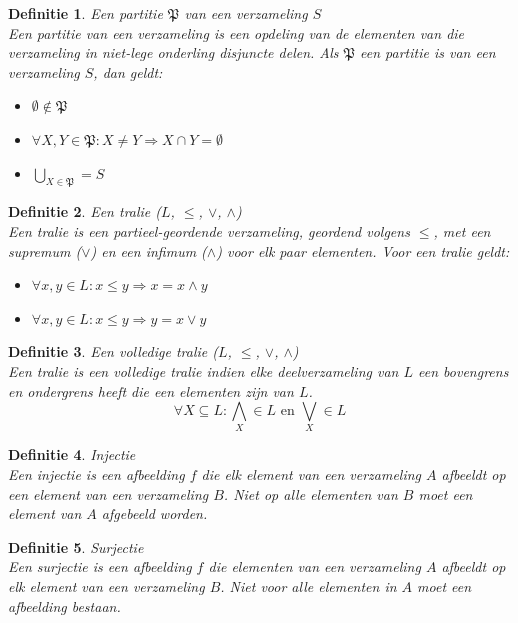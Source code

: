 \documentclass[a4paper]{article}
\newtheorem{tdefinitie}{Definitie}[section]
\newenvironment{definitie}[1]%
  {\begin{mdframed}[backgroundcolor=silver,
    topline=false,
    rightline=false,
    leftline=false,
    bottomline=false]\begin{tdefinitie}#1\\\normalfont}%
  {\end{tdefinitie}\end{mdframed}}
\newcommand{\partition}{\ensuremath{\mathfrak{P}}}
\newcommand{\en}{\ensuremath{\text{ en }}}
\begin{document}
\begin{definitie}{Een partitie $\partition$ van een verzameling $S$}
  Een partitie van een verzameling is een opdeling van de elementen van die verzameling in niet-lege onderling disjuncte delen. Als $\partition$ een partitie is van een verzameling $S$, dan geldt:
  \begin{itemize}
  \item $\emptyset \notin \partition$
  \item $\forall X, Y \in \partition: X \neq Y \Rightarrow X \cap Y = \emptyset$
  \item $\bigcup_{X \in \partition} = S$
  \end{itemize}
\end{definitie}

\begin{definitie}{Een tralie ($L$, $\leq$, $\vee$, $\wedge$)}
  Een tralie is een partieel-geordende verzameling, geordend volgens $\leq$, met een supremum ($\vee$) en een infimum ($\wedge$) voor elk paar elementen. Voor een tralie geldt:
  \begin{itemize}
  \item $\forall x, y \in L: x \leq y \Rightarrow x = x \wedge y$
  \item $\forall x, y \in L: x \leq y \Rightarrow y = x \vee y$
  \end{itemize}
\end{definitie}

\begin{definitie}{Een volledige tralie ($L$, $\leq$, $\vee$, $\wedge$)}
  Een tralie is een volledige tralie indien elke deelverzameling van $L$ een bovengrens en ondergrens heeft die een elementen zijn van $L$.
  \begin{equation*}
  \forall X \subseteq L: \bigwedge_X \in L \en \bigvee_X \in L
  \end{equation*}
\end{definitie}

\begin{definitie}{Injectie}
  \label{def:inj}
  Een injectie is een afbeelding $f$ die elk element van een verzameling $A$ afbeeldt op een element van een verzameling $B$. Niet op alle elementen van $B$ moet een element van $A$ afgebeeld worden.
\end{definitie}

\begin{definitie}{Surjectie}
  \label{def:surj}
  Een surjectie is een afbeelding $f$ die elementen van een verzameling $A$ afbeeldt op elk element van een verzameling $B$. Niet voor alle elementen in $A$ moet een afbeelding bestaan.
\end{definitie}
\end{document}
